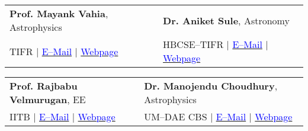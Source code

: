 \documentclass[margin,line]{res}
\begin{document}
\begin{resume}
\begin{tabular}{@{}p{3in}p{3in}}
\textbf{Prof. Mayank Vahia}, Astrophysics & \textbf{Dr. Aniket Sule}, Astronomy \\
TIFR $|$ \href{mailto:vahia@tifr.res.in}{\textcolor{blue}{E--Mail}} $|$ \href{http://www.tifr.res.in/~vahia/}{\textcolor{blue}{Webpage}} & HBCSE--TIFR $|$ \href{mailto:anikets@hbcse.tifr.res.in}{\textcolor{blue}{E--Mail}} $|$ \href{http://www.hbcse.tifr.res.in/people/academic/aniket-sule}{\textcolor{blue}{Webpage}} \\
\end{tabular}
\vspace{-0.15in}

\begin{tabular}{@{}p{3in}p{3in}}
\textbf{Prof. Rajbabu Velmurugan}, EE & \textbf{Dr. Manojendu Choudhury}, Astrophysics \\
IITB $|$ \href{mailto:rajbabu@ee.iitb.ac.in}{\textcolor{blue}{E--Mail}} $|$ \href{https://www.ee.iitb.ac.in/web/faculty/homepage/rajbabu}{\textcolor{blue}{Webpage}} & UM--DAE CBS $|$ \href{mailto:manojendu@cbs.ac.in}{\textcolor{blue}{E--Mail}} $|$ \href{http://www.cbs.ac.in/people/physics-faculty/manojendu-choudhury}{\textcolor{blue}{Webpage}} \\
\end{tabular}
\vspace{-0.15in}

\end{resume}
\end{document}
